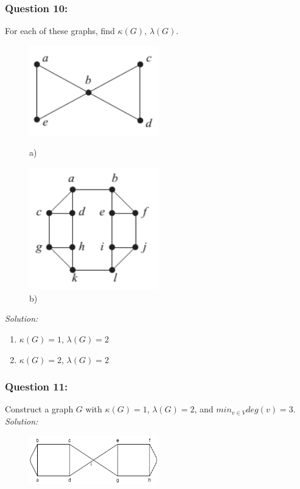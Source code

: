 \documentclass[a4paper]{article}
\begin{document}
	\subsubsection*{Question 10:}
	For each of these graphs, find $\kappa(G)$, $\lambda(G)$.
	\begin{figure}[H]
		\begin{minipage}{0.5\textwidth}
			\centering
			\includegraphics[width=0.5\textwidth]{tut910_1.png}
			\caption*{a)}
		\end{minipage}
		\begin{minipage}{0.5\textwidth}
			\centering
			\includegraphics[width=0.5\textwidth]{tut910_2.png}
			\caption*{b)}
		\end{minipage}
	\end{figure}
	\emph{Solution:} 
	\begin{enumerate}[label = \alph*)]
	    \item $\kappa(G) = 1$, $\lambda(G) = 2$ 
	    \item $\kappa(G) = 2$, $\lambda(G) = 2$ 
    \end{enumerate}
	\subsubsection*{Question 11:}
	Construct a graph $G$ with $\kappa(G)=1$, $\lambda(G)=2$, and $min_{v \in V} deg(v) = 3$.\\
	\emph{Solution:}
	\begin{figure}[H]
		\centering
		\includegraphics[width=0.5\textwidth]{tut910_3.png}
	\end{figure}
\end{document}
